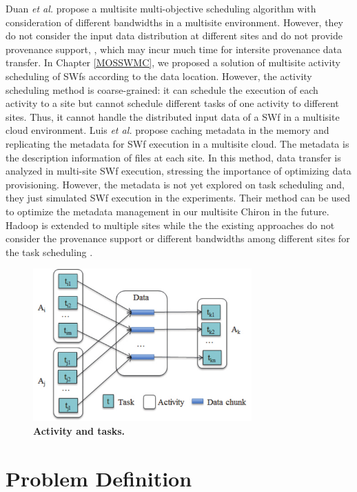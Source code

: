 Duan \textit{et al.} \cite{Duan2014} propose a multisite multi-objective scheduling algorithm with consideration of different bandwidths in a multisite environment. 
However, they do not consider the input data distribution at different sites and do not provide provenance support, , which may incur much time for intersite provenance data transfer.
In Chapter \ref{MOSSWMC}, we proposed a solution of multisite activity scheduling of SWfs according to the data location. However, the activity scheduling method is coarse-grained: it can schedule the execution of each activity to a site but cannot schedule different tasks of one activity to different sites. Thus, it cannot handle the distributed input data of a SWf in a multisite cloud environment. Luis \textit{et al.} \cite{Luis2015} propose caching metadata in the memory and replicating the metadata for SWf execution in a multisite cloud. The metadata is the description information of files at each site. In this method, data transfer is analyzed in multi-site SWf execution, stressing the importance of optimizing data provisioning. However, the metadata is not yet explored on task scheduling and, they just simulated SWf execution in the experiments. 
Their method can be used to optimize the metadata management in our multisite Chiron in the future.
Hadoop \cite{White2009} is extended to multiple sites while the the existing approaches do not consider the provenance support or different bandwidths among different sites for the task scheduling \cite{Wang2013}.


\begin{figure}
\begin{centering}
\captionsetup{justification=centering}
\includegraphics[width=84mm]{figures/SIMD}
\par\end{centering}
\caption{\textbf{Activity and tasks. }}
\label{fig:SIMD}
\end{figure}

\section{Problem Definition}
\label{sec:FGPD}


